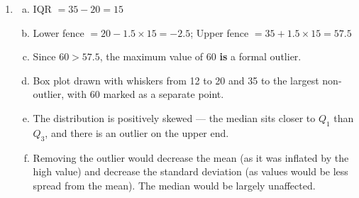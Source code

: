 \documentclass{article}
\begin{document}
\begin{enumerate}
  \item
  \begin{enumerate}[(a)]
    \item IQR $= 35 - 20 = 15$
    \item Lower fence $= 20 - 1.5 \times 15 = -2.5$; Upper fence $= 35 + 1.5 \times 15 = 57.5$
    \item Since $60 > 57.5$, the maximum value of 60 \textbf{is} a formal outlier.
    \item Box plot drawn with whiskers from 12 to 20 and 35 to the largest non-outlier, with
    60 marked as a separate point.
    \item The distribution is positively skewed --- the median sits closer to $Q_1$ than $Q_3$,
    and there is an outlier on the upper end.
    \item Removing the outlier would decrease the mean (as it was inflated by the high value)
    and decrease the standard deviation (as values would be less spread from the mean). The
    median would be largely unaffected.
  \end{enumerate}

\end{enumerate}
\end{document}
